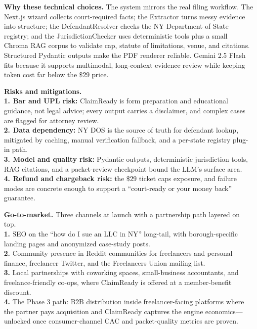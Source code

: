 \documentclass[11pt]{article}
\begin{document}
{\bfseries Why these technical choices.} The system mirrors the real filing workflow. The Next.js wizard collects court-required facts; the Extractor turns messy evidence into structure; the DefendantResolver checks the NY Department of State registry; and the JurisdictionChecker uses deterministic tools plus a small Chroma RAG corpus to validate cap, statute of limitations, venue, and citations. Structured Pydantic outputs make the PDF renderer reliable. Gemini 2.5 Flash fits because it supports multimodal, long-context evidence review while keeping token cost far below the \(\$29\) price.

{\bfseries Risks and mitigations.}\\[-1pt]
\textbf{1. Bar and UPL risk:} ClaimReady is form preparation and educational guidance, not legal advice; every output carries a disclaimer, and complex cases are flagged for attorney review.\\[-1pt]
\textbf{2. Data dependency:} NY DOS is the source of truth for defendant lookup, mitigated by caching, manual verification fallback, and a per-state registry plug-in path.\\[-1pt]
\textbf{3. Model and quality risk:} Pydantic outputs, deterministic jurisdiction tools, RAG citations, and a packet-review checkpoint bound the LLM's surface area.\\[-1pt]
\textbf{4. Refund and chargeback risk:} the \(\$29\) ticket caps exposure, and failure modes are concrete enough to support a ``court-ready or your money back'' guarantee.

{\bfseries Go-to-market.} Three channels at launch with a partnership path layered on top.\\[-1pt]
\textbf{1.} SEO on the ``how do I sue an LLC in NY'' long-tail, with borough-specific landing pages and anonymized case-study posts.\\[-1pt]
\textbf{2.} Community presence in Reddit communities for freelancers and personal finance, freelancer Twitter, and the Freelancers Union mailing list.\\[-1pt]
\textbf{3.} Local partnerships with coworking spaces, small-business accountants, and freelance-friendly co-ops, where ClaimReady is offered at a member-benefit discount.\\[-1pt]
\textbf{4.} The Phase 3 path: B2B distribution inside freelancer-facing platforms where the partner pays acquisition and ClaimReady captures the engine economics---unlocked once consumer-channel CAC and packet-quality metrics are proven.
\end{document}
